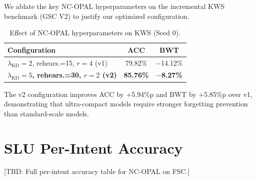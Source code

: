 \documentclass[11pt]{article}
\begin{document}
We ablate the key NC-OPAL hyperparameters on the incremental KWS benchmark (GSC V2) to justify our optimized configuration.

\begin{table}[h]
\centering
\small
\caption{Effect of NC-OPAL hyperparameters on KWS (Seed 0).}
\label{tab:kws_hp}
\begin{tabular}{@{}lcc@{}}
\toprule
\textbf{Configuration} & \textbf{ACC} & \textbf{BWT} \\
\midrule
$\lambda_{\text{KD}}{=}2$, rehears.=15, $r{=}4$ (v1) & 79.82\% & $-$14.12\% \\
\textbf{$\lambda_{\text{KD}}{=}5$, rehears.=30, $r{=}2$ (v2)} & \textbf{85.76\%} & \textbf{$-$8.27\%} \\
\bottomrule
\end{tabular}
\end{table}

The v2 configuration improves ACC by +5.94\%p and BWT by +5.85\%p over v1, demonstrating that ultra-compact models require stronger forgetting prevention than standard-scale models.

\section{SLU Per-Intent Accuracy}
\label{app:perintent}

[TBD: Full per-intent accuracy table for NC-OPAL on FSC.]
\end{document}
